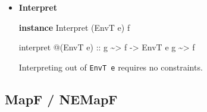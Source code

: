 \documentclass[]{article}
\newenvironment{Shaded}{}{}
\newcommand{\DataTypeTok}[1]{\textcolor[rgb]{0.56,0.13,0.00}{#1}}
\newcommand{\KeywordTok}[1]{\textcolor[rgb]{0.00,0.44,0.13}{\textbf{#1}}}
\newcommand{\NormalTok}[1]{#1}
\newcommand{\OperatorTok}[1]{\textcolor[rgb]{0.40,0.40,0.40}{#1}}
\newcommand{\OtherTok}[1]{\textcolor[rgb]{0.00,0.44,0.13}{#1}}
\begin{document}
\begin{itemize}
\item
  \textbf{Interpret}

\begin{Shaded}
\begin{Highlighting}[]
\KeywordTok{instance} \DataTypeTok{Interpret}\NormalTok{ (}\DataTypeTok{EnvT}\NormalTok{ e) f}

\NormalTok{interpret }\OperatorTok{@}\NormalTok{(}\DataTypeTok{EnvT}\NormalTok{ e)}
\OtherTok{    ::}\NormalTok{ g }\OperatorTok{\textasciitilde{}>}\NormalTok{ f}
    \OtherTok{{-}>} \DataTypeTok{EnvT}\NormalTok{ e g }\OperatorTok{\textasciitilde{}>}\NormalTok{ f}
\end{Highlighting}
\end{Shaded}

  Interpreting out of \texttt{EnvT\ e} requires no constraints.
\end{itemize}

\hypertarget{mapf-nemapf}{%
\subsection{MapF / NEMapF}\label{mapf-nemapf}}
\end{document}

